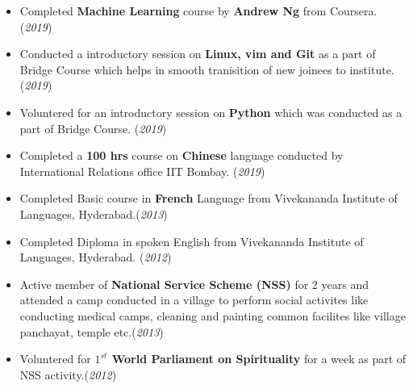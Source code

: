 \documentclass[10pt]{article}
\begin{document}
\colorbox{bl}{}
\vspace{-0.45cm}
\begin{itemize}[leftmargin=0.4cm]
        \item {Completed \textbf{Machine Learning} course by \textbf{Andrew Ng} from Coursera. }\hfill{(\textit{2019})}\vspace{-0.2cm}
    \item {Conducted a introductory session on \textbf{Linux, vim and Git} as a part of Bridge Course which helps in smooth tranisition of new joinees to institute. }\hfill{(\textit{2019})}\vspace{-0.2cm}
    \item {Voluntered for an introductory session on \textbf{Python} which was conducted as a part of Bridge Course.}
    \hfill{(\textit{2019})}\vspace{-0.2cm}
    \item {Completed a \textbf{100 hrs} course on \textbf{Chinese} language conducted by International Relations office IIT Bombay. }\hfill{(\textit{2019})}\vspace{-0.2cm}
    \item {Completed Basic course in \textbf{French} Language from Vivekananda Institute of Languages, Hyderabad.}\hfill{(\textit{2013})}\vspace{-0.2cm}

    \item {Completed Diploma in spoken English from Vivekananda Institute of Languages, Hyderabad.} \hfill{(\textit{2012})}\vspace{-0.2cm}
   \item {Active member of \textbf{National Service Scheme (NSS)} for 2 years and attended a camp conducted in a village to perform social activites like conducting medical camps, cleaning and painting common facilites like village panchayat, temple etc.}\hfill{(\textit{2013})}\vspace{-0.2cm}
   \item {Voluntered for \textbf{$1^{st}$ World Parliament on Spirituality} for a week as part of NSS activity.}\hfill{(\textit{2012})}\vspace{-0.2cm}

\end{itemize}

\end{document}
